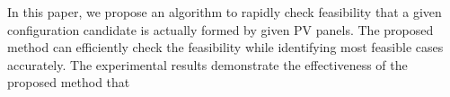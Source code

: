 \documentclass[conference]{pvsctran}
\begin{document}
In this paper, we propose an algorithm to rapidly check feasibility that a given configuration candidate is actually formed by given PV panels. 
The proposed method can efficiently check the feasibility while identifying most feasible cases accurately. 
The experimental results demonstrate the effectiveness of the proposed method that 
\end{document}

